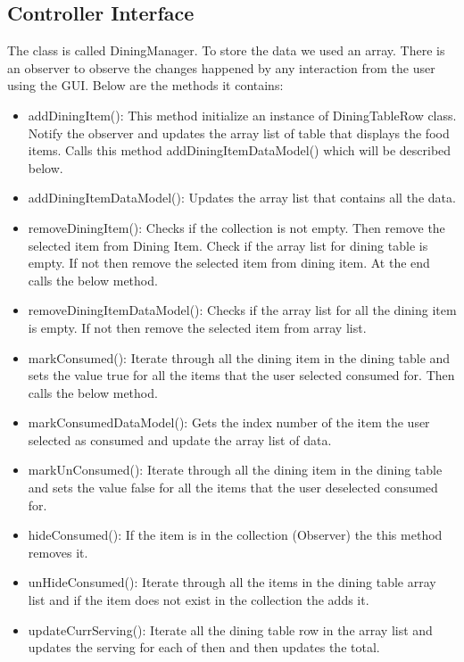 \documentclass{scrreprt}
\begin{document}
\subsection{Controller Interface}

The class is called DiningManager. To store the data we used an array. There is an observer to observe the changes happened by any interaction from the user using the GUI. Below are the methods it contains:

\begin{itemize}
	\item addDiningItem(): This method initialize an instance of DiningTableRow class. Notify the observer and updates the array list of table that displays the food items. Calls this method addDiningItemDataModel() which will be described below.
	\item addDiningItemDataModel(): Updates the array list that contains all the data.
	\item removeDiningItem(): Checks if the collection is not empty. Then remove the selected item from Dining Item. Check if the array list for dining table is empty. If not then remove the selected item from dining item. At the end calls the below method.
	\item removeDiningItemDataModel(): Checks if the array list for all the dining item is empty. If not then remove the selected item from array list.
	\item markConsumed(): Iterate through all the dining item in the dining table and sets the value true for all the items that the user selected consumed for. Then calls the below method.
	\item markConsumedDataModel(): Gets the index number of the item the user selected as consumed and update the array list of data.
	\item markUnConsumed(): Iterate through all the dining item in the dining table and sets the value false for all the items that the user deselected consumed for.
	\item hideConsumed(): If the item is in the collection (Observer) the this method removes it.
	\item unHideConsumed(): Iterate through all the items in the dining table array list and if the item does not exist in the collection the adds it.
	\item updateCurrServing(): Iterate all the dining table row in the array list and updates the serving for each of then and then updates the total.
\end{itemize}
\end{document}
